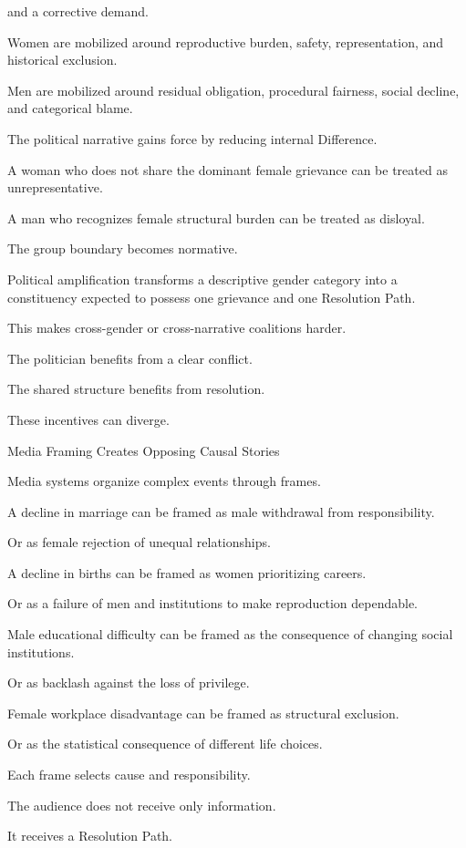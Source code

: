 and a corrective demand.

Women are mobilized around reproductive burden, safety, representation, and historical exclusion.

Men are mobilized around residual obligation, procedural fairness, social decline, and categorical blame.

The political narrative gains force by reducing internal Difference.

A woman who does not share the dominant female grievance can be treated as unrepresentative.

A man who recognizes female structural burden can be treated as disloyal.

The group boundary becomes normative.

Political amplification transforms a descriptive gender category into a constituency expected to possess one grievance and one Resolution Path.

This makes cross-gender or cross-narrative coalitions harder.

The politician benefits from a clear conflict.

The shared structure benefits from resolution.

These incentives can diverge.

Media Framing Creates Opposing Causal Stories

Media systems organize complex events through frames.

A decline in marriage can be framed as male withdrawal from responsibility.

Or as female rejection of unequal relationships.

A decline in births can be framed as women prioritizing careers.

Or as a failure of men and institutions to make reproduction dependable.

Male educational difficulty can be framed as the consequence of changing social institutions.

Or as backlash against the loss of privilege.

Female workplace disadvantage can be framed as structural exclusion.

Or as the statistical consequence of different life choices.

Each frame selects cause and responsibility.

The audience does not receive only information.

It receives a Resolution Path.

